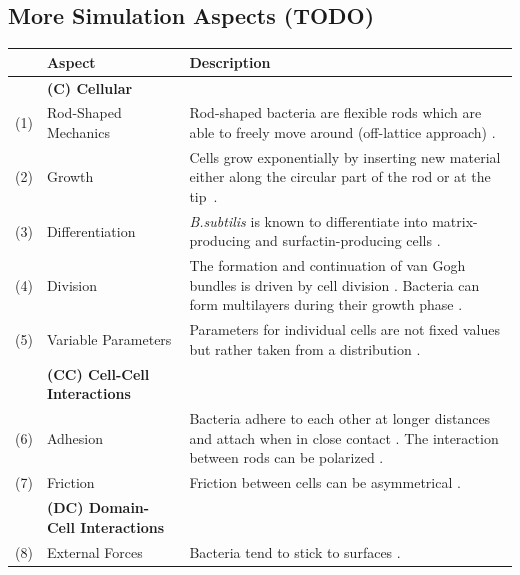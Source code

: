 \documentclass[10pt,letterpaper]{article}
\begin{document}
\subsection{More Simulation Aspects (TODO)}
\label{section:supplement-more-simulation-aspects}
\begin{table}[H]
    \centering
    \def\arraystretch{1.3}
    \begin{tabularx}{\textwidth}{c l X}
        &\textbf{Aspect} & \textbf{Description}\\
        \toprule
        &\textbf{(C) Cellular}\\
        \midrule
        (1) & Rod-Shaped Mechanics &
            Rod-shaped bacteria are flexible rods which are able to freely move around (off-lattice
            approach) \cite{Takeuchi2005,Ursell2014,Amir2014_2}.\\
        (2) & Growth &
            Cells grow exponentially by inserting new material either along the circular part of the
            rod or at the tip~\cite{Robert2014,Takeuchi2005}.\\
        (3) & Differentiation &
            \textit{B.subtilis} is known to differentiate into matrix-producing and
            surfactin-producing cells \cite{vanGestel2015,Lpez2010}.\\
        (4) & Division &
            The formation and continuation of van Gogh bundles is driven by cell division
            \cite{vanGestel2015}.
            Bacteria can form multilayers during their growth phase \cite{Duvernoy2018}.\\
        (5) & Variable Parameters &
            Parameters for individual cells are not fixed values but rather taken from a
            distribution \cite{Koutsoumanis2013}.\\
        &\textbf{(CC) Cell-Cell Interactions}\\
        \midrule
        (6) & Adhesion &
            Bacteria adhere to each other at longer distances and attach when in close contact
            \cite{Verwey1947,Trejo2013}.
            The interaction between rods can be polarized \cite{Duvernoy2018}.\\
        (7) & Friction &
            Friction between cells \cite{Grant2014} can be asymmetrical \cite{Doumic2020}.\\
        &\textbf{(DC) Domain-Cell Interactions}\\
        \midrule
        (8) & External Forces &
            Bacteria tend to stick to surfaces \cite{vanLoosdrecht1989}.

\end{tabularx}
\end{table}
\end{document}
